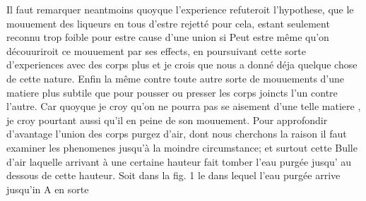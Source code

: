 \pstart
[140 r\textsuperscript{o}] Il faut remarquer neantmoins quoyque l'experience refuteroit l'hypothese, que le mouuement des liqueurs en tous  d'estre rejetté pour cela, estant seulement reconnu trop  foible pour estre cause d'une union si   Peut estre même qu'on découuriroit ce mouuement par ses effects, en poursuivant cette sorte d'experiences avec  des corps plus   et je crois que  nous a donné  déja quelque chose de cette nature. Enfin la même  contre toute autre  sorte de mouuements d'une matiere plus  subtile que  pour pousser ou presser les corps joincts l'un  contre l'autre. Car quoyque je croy qu'on ne  pourra pas se  aisement d'une telle matiere , je croy pourtant aussi qu'il  en peine de son mouuement.
\pend
                        \pstart
Pour approfondir d'avantage l'union  des corps purgez d'air, dont nous cherchons  la raison il faut examiner les phenomenes  jusqu'à la moindre circumstance; et surtout  cette Bulle d'air laquelle arrivant à une  certaine hauteur fait tomber l'eau purgée jusqu'  au dessous de cette hauteur. Soit dans la fig. 1  le   dans lequel l'eau purgée arrive jusqu'in A en sorte
